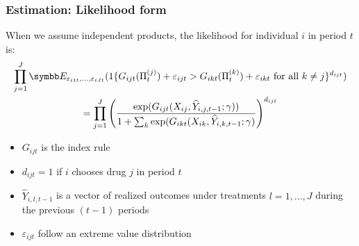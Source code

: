 \documentclass[aspectratio=169,11pt]{beamer}
\begin{document}

\begin{frame}[label=ESTIMATION]

\frametitle{Estimation: Likelihood form}

When we assume independent products, the likelihood for individual $i$ in
period $t$ is:%
\begin{multline*}
\prod_{j=1}^{J} \E_{\varepsilon _{i1t},...,\varepsilon _{iJt}}(1\{G_{ijt}(\Pi
_{t}^{(j)})+\varepsilon_{ijt}>G_{ikt}(\Pi _{t}^{(k)})+\varepsilon_{ikt}\text{
for all }k\neq j\}^{d_{ijt}}) \\
=\prod_{j=1}^{J}\left( \frac{\exp (G_{ijt}(X_{ij},\widehat{Y}%
_{i,j,t-1};\gamma ))}{1+\sum_{k}\exp (G_{ikt}(X_{ik},\widehat{Y}%
_{i,k,t-1};\gamma )}\right) ^{d_{ijt}}
\end{multline*}

\begin{itemize}
\item $G_{ijt}$ is the index rule

\item $d_{ijt}=1$ if $i$ chooses drug $j$ in period $t$

\item $\widehat{Y}_{i,l,t-1}$ is a vector of realized outcomes under
treatments $l=1,...,J$ during the previous $(t-1)$ periods

\item $\varepsilon _{ijt}$ follow an extreme value distribution
\end{itemize}
\end{frame}

\end{document}
